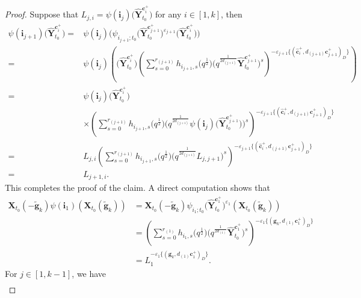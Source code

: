 \documentclass[10pt,a4paper]{amsart}
\numberwithin{equation}{section}
\begin{document}
\begin{proof}
 Suppose that $L_{j,i}=\psi(\mathbf{i}_{j})\bigl(\mathbf{\hat{Y}}_{t_{0}}^{\mathbf{c}_{i}^{+}}\bigr)$ for any $i\in[1,k]$, then
 \begin{align*}
 \psi(\mathbf{i}_{j+1})\bigl(\mathbf{\hat{Y}}_{t_{0}}^{\mathbf{c}_{i}^{+}}\bigr)
 ={}&\psi(\mathbf{i}_{j})\bigl(\psi_{i_{j+1};t_{0}}\bigl(\mathbf{\hat{Y}}_{t_{0}}^{\mathbf{c}_{j+1}^{+}}\bigr)^{\varepsilon_{j+1}}\bigl(\mathbf{\hat{Y}}_{t_{0}}^{\mathbf{c}_{i}^{+}}\bigr)\bigr)\\
 ={}&\psi(\mathbf{i}_{j})\left(\bigl(\mathbf{\hat{Y}}_{t_{0}}^{\mathbf{c}_{i}^{+}}\bigr)\left(\sum\limits^{r_{(j+1)}}_{s=0}h_{i_{j+1},s}
 \bigl(q^{\frac{1}{2}}\bigr)\bigl(q^{\frac{1}{2d_{(j+1)}}}\mathbf{\hat{Y}}_{t_{0}}^{\mathbf{c}_{j+1}^{+}}\bigr)^{s}\right)^{-\varepsilon_{j+1}
 \{(\mathbf{\hat{c}}_{i}^{+},d_{(j+1)}\mathbf{c}_{j+1}^{+})_{D}\}}\right)\\
 ={}&\psi(\mathbf{i}_{j})\bigl(\mathbf{\hat{Y}}_{t_{0}}^{\mathbf{c}_{i}^{+}}\bigr)\\
 &\times\left(\sum\limits^{r_{(j+1)}}_{s=0}h_{i_{j+1},s}\bigl(q^{\frac{1}{2}}\bigr)
 \bigl(q^{\frac{1}{2d_{(j+1)}}}\psi(\mathbf{i}_{j})\bigl(\mathbf{\hat{Y}}_{t_{0}}^{\mathbf{c}_{j+1}^{+}}\bigr)\bigr)^{s}\right)^{-\varepsilon_{j+1}\{(\mathbf{\hat{c}}_{i}^{+},d_{(j+1)}\mathbf{c}_{j+1}^{+})_{D}\}}\\
 ={}&L_{j,i}\left(\sum\limits^{r_{(j+1)}}_{s=0}h_{i_{j+1},s}\bigl(q^{\frac{1}{2}}\bigr)\bigl(q^{\frac{1}{2d_{(j+1)}}}L_{j,j+1}\bigr)^{s}\right)^{-\varepsilon_{j+1}
 \{(\mathbf{\hat{c}}_{i}^{+},d_{(j+1)}\mathbf{c}_{j+1}^{+})_{D}\}}\\
 ={}&L_{j+1,i}.
 \end{align*}
 This completes the proof of the claim.
 A direct computation shows that
 \begin{align*}
 \mathbf{X}_{t_0}(-\mathbf{\tilde{g}}_{k})\psi(\mathbf{i}_{1})(\mathbf{X}_{t_0}(\mathbf{\tilde{g}}_{k}))
 &=\mathbf{X}_{t_0}(-\mathbf{\tilde{g}}_{k})\psi_{i_{1};t_{0}}\bigl(\mathbf{\hat{Y}}_{t_{0}}^{\mathbf{c}_{1}^{+}}\bigr)^{\varepsilon_{1}}(\mathbf{X}_{t_0}(\mathbf{\tilde{g}}_{k}))\\
 &=\left(\sum\limits^{r_{(1)}}_{s=0}h_{i_{1},s}\bigl(q^{\frac{1}{2}}\bigr)\bigl(q^{\frac{1}{2d_{(1)}}}\mathbf{\hat{Y}}_{t_{0}}^{\mathbf{c}_{1}^{+}}\bigr)^{s}\right)^{-\varepsilon_{1}\{(\mathbf{g}_{k},d_{(1)}\mathbf{c}_{1}^{+})_{D}\}}\\
 &=L_{1}^{-\varepsilon_{1}\{(\mathbf{g}_{k},d_{(1)}\mathbf{c}_{1}^{+})_{D}\}}.
 \end{align*}
 For $j\in[1,k-1]$, we have
 \begin{gather*}

\end{gather*}
\end{proof}
\end{document}
